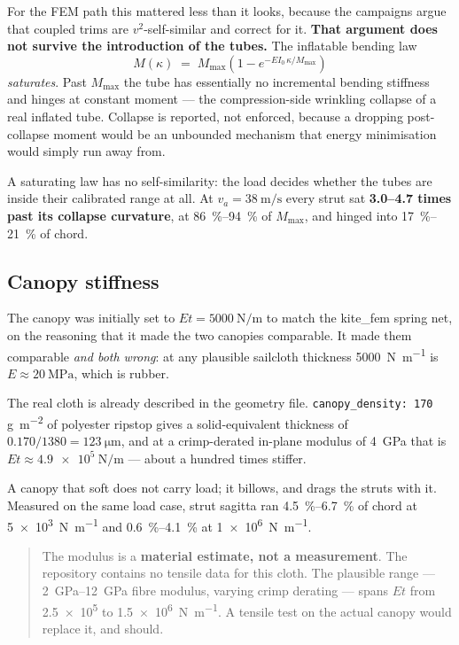\documentclass[11pt,a4paper]{article}
\newcommand{\code}[1]{\texttt{\small #1}}
\begin{document}
For the FEM path this mattered less than it looks, because the campaigns argue
that coupled trims are $v^2$-self-similar and correct for it. \textbf{That
argument does not survive the introduction of the tubes.} The inflatable bending
law
\begin{equation}
  M(\kappa) \;=\; M_{\max}\left(1 - e^{-EI_0\,\kappa / M_{\max}}\right)
\end{equation}
\emph{saturates}. Past $M_{\max}$ the tube has essentially no incremental
bending stiffness and hinges at constant moment --- the compression-side
wrinkling collapse of a real inflated tube. Collapse is reported, not enforced,
because a dropping post-collapse moment would be an unbounded mechanism that
energy minimisation would simply run away from.

A saturating law has no self-similarity: the load decides whether the tubes are
inside their calibrated range at all. At $v_a = \SI{38}{\metre\per\second}$
every strut sat \textbf{\numrange{3.0}{4.7} times past its collapse curvature},
at \SIrange{86}{94}{\percent} of $M_{\max}$, and hinged into
\SIrange{17}{21}{\percent} of chord.

\subsection{Canopy stiffness}
\label{sec:canopy}

The canopy was initially set to $Et = \SI{5000}{\newton\per\metre}$ to match the
kite\_fem spring net, on the reasoning that it made the two canopies
comparable. It made them comparable \emph{and both wrong}: at any plausible
sailcloth thickness \SI{5000}{\newton\per\metre} is $E \approx \SI{20}{\mega\pascal}$,
which is rubber.

The real cloth is already described in the geometry file.
\code{canopy\_density: 170}\,\si{\gram\per\metre\squared} of polyester ripstop
gives a solid-equivalent thickness of $0.170/1380 = \SI{123}{\micro\metre}$, and
at a crimp-derated in-plane modulus of \SI{4}{\giga\pascal} that is
$Et \approx \SI{4.9e5}{\newton\per\metre}$ --- about a hundred times stiffer.

A canopy that soft does not carry load; it billows, and drags the struts with
it. Measured on the same load case, strut sagitta ran
\SIrange{4.5}{6.7}{\percent} of chord at \SI{5e3}{\newton\per\metre} and
\SIrange{0.6}{4.1}{\percent} at \SI{1e6}{\newton\per\metre}.

\begin{quote}\small\color{muted}
The modulus is a \textbf{material estimate, not a measurement}. The repository
contains no tensile data for this cloth. The plausible range ---
\SIrange{2}{12}{\giga\pascal} fibre modulus, varying crimp derating --- spans
$Et$ from \SI{2.5e5}{} to \SI{1.5e6}{\newton\per\metre}. A tensile test on the
actual canopy would replace it, and should.
\end{quote}
\end{document}
